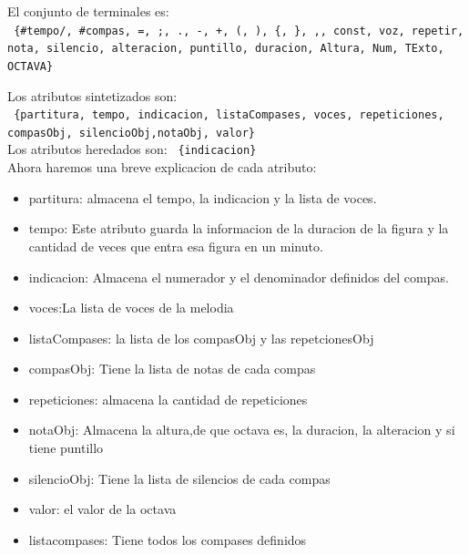 \documentclass[a4paper]{article}
\begin{document}
El conjunto de terminales es: \\
\texttt{
\{\#tempo/, \#compas, =, ;, ., -, +, (, ), \{, \}, ,,  const, voz, repetir, nota, silencio,  alteracion, puntillo, duracion, Altura, Num, TExto, OCTAVA\}
}\linebreak

Los atributos sintetizados son:\\
\texttt{
\{partitura, tempo, indicacion, listaCompases, voces, repeticiones, compasObj, silencioObj,notaObj, valor\}
}\\  


Los atributos heredados son: 
\texttt{
\{indicacion\}
}\\  

Ahora haremos una breve explicacion de cada atributo:

\begin{itemize}
\item partitura: almacena el tempo, la indicacion y la lista de voces. 

\item tempo: Este atributo guarda la informacion de la duracion de la figura y la cantidad de veces que entra esa figura en un minuto.

\item indicacion: Almacena el numerador y el denominador definidos del compas.

\item voces:La lista de voces de la melodia

\item listaCompases: la lista de los compasObj y las repetcionesObj

\item compasObj: Tiene la lista de notas  de cada compas
\item repeticiones: almacena la cantidad de repeticiones
\item notaObj: Almacena la altura,de que octava es, la duracion, la alteracion y si tiene puntillo
\item silencioObj: Tiene la lista de silencios de cada compas
\item valor: el valor de la octava 
\item listacompases: Tiene todos los compases definidos

\end{itemize}
\end{document}
